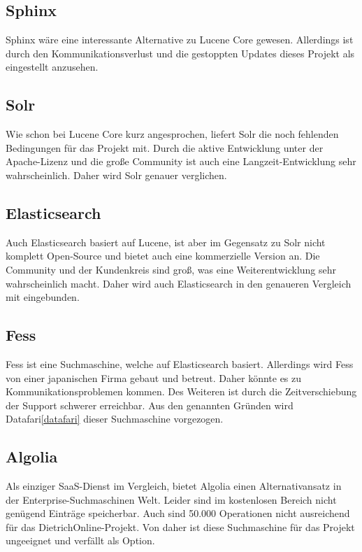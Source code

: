 \subsection{Sphinx}

Sphinx wäre eine interessante Alternative zu Lucene Core gewesen. Allerdings ist durch den Kommunikationsverlust und die gestoppten Updates dieses Projekt als eingestellt anzusehen. \cite{SphinxTechnologiesInc.2019}

\subsection{Solr}

Wie schon bei Lucene Core kurz angesprochen, liefert Solr die noch fehlenden Bedingungen für das Projekt mit. Durch die aktive Entwicklung unter der Apache-Lizenz und die große Community ist auch eine Langzeit-Entwicklung sehr wahrscheinlich. Daher wird Solr genauer verglichen. \cite{TheApacheSoftwareFoundation.2019}

\subsection{Elasticsearch}

Auch Elasticsearch basiert auf Lucene, ist aber im Gegensatz zu Solr nicht komplett Open-Source und bietet auch eine kommerzielle Version an. Die Community und der Kundenkreis sind groß, was eine Weiterentwicklung sehr wahrscheinlich macht. Daher wird auch Elasticsearch in den genaueren Vergleich mit eingebunden. \cite{Elasticsearch.2019}

\subsection{Fess}

Fess ist eine Suchmaschine, welche auf Elasticsearch basiert. Allerdings wird Fess von einer japanischen Firma gebaut und betreut. Daher könnte es zu Kommunikationsproblemen kommen. Des Weiteren ist durch die Zeitverschiebung der Support schwerer erreichbar. Aus den genannten Gründen wird Datafari\ref{datafari} dieser Suchmaschine vorgezogen. \cite{CodeLibs.2019}

\subsection{Algolia}

Als einziger SaaS-Dienst im Vergleich, bietet Algolia einen Alternativansatz in der Enterprise-Suchmaschinen Welt. Leider sind im kostenlosen Bereich nicht genügend Einträge speicherbar. Auch sind 50.000 Operationen nicht ausreichend für das DietrichOnline-Projekt. Von daher ist diese Suchmaschine für das Projekt ungeeignet und verfällt als Option. \cite{Algolia.2019}

